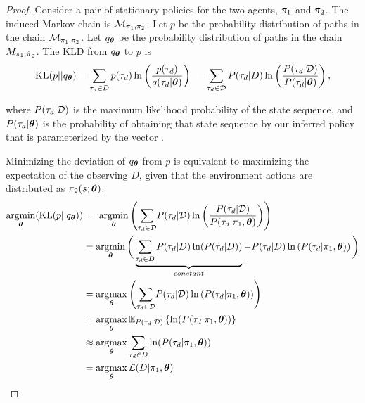     \begin{proof}
        Consider a pair of stationary policies for the two agents, $\pi_{1}$ and $\pi_{2}$. The induced Markov
        chain is $\mathcal{M}_{\pi_{1}, \pi_{2}}$. Let $p$ be the probability distribution of paths in the chain
        $\mathcal{M}_{\pi_{1}, \pi_{2}}$. Let $q_{\boldsymbol{\mathbb{\theta}}}$ be the probability distribution of paths in the
        chain $M_{\pi_{1}, \hat{\pi_{}}_2}$. The \ac{KLD} from $q_{\boldsymbol{\mathbb{\theta}}}$ to $p$ is
        \begin{equation*}\label{eq:traj_kl_div}
            \text{KL}(p || q_{\boldsymbol{\mathbb{\theta}}}) = \sum_{\tau_d \in D} p(\tau_d) \ln \left( \frac{p(\tau_d)}
                                                {q(\tau_d|\boldsymbol{\mathbb{\theta}})} \right)\
                                          = \sum_{\tau_d \in \mathcal{D}} P(\tau_d|D) \ln \left( \frac{P(\tau_d|\mathcal{D})}
                                                {P(\tau_d|\boldsymbol{\mathbb{\theta}})} \right),
        \end{equation*}

        \noindent
        where $P(\tau_d|\mathcal{D})$ is the maximum likelihood probability of the state sequence, and
        $P(\tau_d|\boldsymbol{\mathbb{\theta}})$ is the probability of obtaining that state sequence by our inferred policy that is
        parameterized by the vector \paramVec.

        Minimizing the deviation of $q_{\boldsymbol{\mathbb{\theta}}}$ from $p$ is equivalent to maximizing the expectation of the
        observing $D$, given that the environment actions are distributed as $\pi_{2}(s; \boldsymbol{\mathbb{\theta}})$:
        \begin{equation}\label{eq:min_kld}
            \begin{aligned}
                \mathop{\mathrm{argmin}}_{\boldsymbol{\mathbb{\theta}}}(\text{KL}(p || q_{\boldsymbol{\mathbb{\theta}}})) & = \
                    \mathop{\mathrm{argmin}}_{\boldsymbol{\mathbb{\theta}}}\left(\sum_{\tau_d \in  \mathcal{D}}\!  P(\tau_d|\mathcal{D})
                    \ln\left(\frac{P(\tau_d|\mathcal{D})}{P(\tau_d|\pi_{1},\boldsymbol{\mathbb{\theta}})}\right)\right)\\
                & = \mathop{\mathrm{argmin}}_{\boldsymbol{\mathbb{\theta}}}\bigg(\underbrace{\sum_{\tau_d \in D} P(\tau_d|D) \ln(P(\tau_d|D))}_{constant} -
                    P(\tau_d|D) \ln\left(P(\tau_d|\pi_{1},\boldsymbol{\mathbb{\theta}})\right)\bigg)\\
                & = \mathop{\mathrm{argmax}}_{\boldsymbol{\mathbb{\theta}}}\left(\sum_{\tau_d \in \mathcal{D}}\!  P(\tau_d|\mathcal{D})
                    \ln\left(P(\tau_d|\pi_{1},\boldsymbol{\mathbb{\theta}})\right)\right)\\
                & = \mathop{\mathrm{argmax}}_{\boldsymbol{\mathbb{\theta}}}\mathbb{E}_{P(\tau_d|\mathcal{D})}\left\{\ln(P(\tau_d|\pi_{1},\boldsymbol{\mathbb{\theta}}))\right\} \\
                &\approx \mathop{\mathrm{argmax}}_{\boldsymbol{\mathbb{\theta}}} \sum_{\tau_d \in D}  \ln(P(\tau_d|\pi_{1},\boldsymbol{\mathbb{\theta}}))\\
                & =\mathop{\mathrm{argmax}}_{\boldsymbol{\mathbb{\theta}}} \mathcal{L}(D|\pi_{1},\boldsymbol{\mathbb{\theta}})
            \end{aligned}
        \end{equation}


\end{proof}
